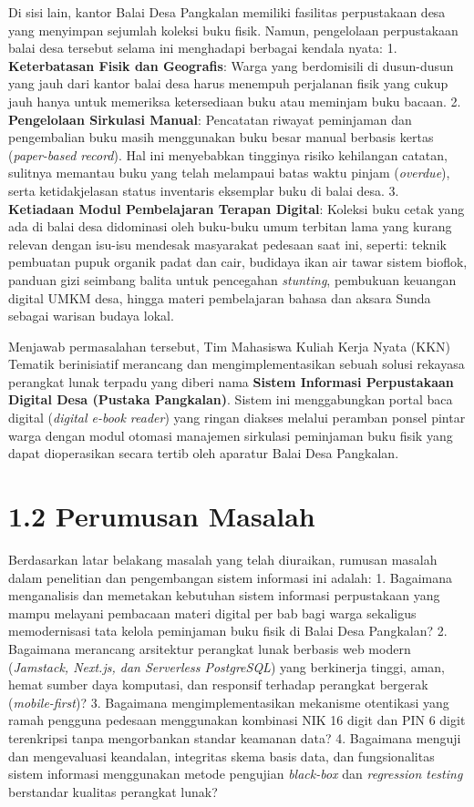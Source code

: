 \documentclass[
  indonesian,
  12pt,
]{report}
\begin{document}
Di sisi lain, kantor Balai Desa Pangkalan memiliki fasilitas
perpustakaan desa yang menyimpan sejumlah koleksi buku fisik. Namun,
pengelolaan perpustakaan balai desa tersebut selama ini menghadapi
berbagai kendala nyata: 1. \textbf{Keterbatasan Fisik dan Geografis}:
Warga yang berdomisili di dusun-dusun yang jauh dari kantor balai desa
harus menempuh perjalanan fisik yang cukup jauh hanya untuk memeriksa
ketersediaan buku atau meminjam buku bacaan. 2. \textbf{Pengelolaan
Sirkulasi Manual}: Pencatatan riwayat peminjaman dan pengembalian buku
masih menggunakan buku besar manual berbasis kertas (\emph{paper-based
record}). Hal ini menyebabkan tingginya risiko kehilangan catatan,
sulitnya memantau buku yang telah melampaui batas waktu pinjam
(\emph{overdue}), serta ketidakjelasan status inventaris eksemplar buku
di balai desa. 3. \textbf{Ketiadaan Modul Pembelajaran Terapan Digital}:
Koleksi buku cetak yang ada di balai desa didominasi oleh buku-buku umum
terbitan lama yang kurang relevan dengan isu-isu mendesak masyarakat
pedesaan saat ini, seperti: teknik pembuatan pupuk organik padat dan
cair, budidaya ikan air tawar sistem bioflok, panduan gizi seimbang
balita untuk pencegahan \emph{stunting}, pembukuan keuangan digital UMKM
desa, hingga materi pembelajaran bahasa dan aksara Sunda sebagai warisan
budaya lokal.

Menjawab permasalahan tersebut, Tim Mahasiswa Kuliah Kerja Nyata (KKN)
Tematik berinisiatif merancang dan mengimplementasikan sebuah solusi
rekayasa perangkat lunak terpadu yang diberi nama \textbf{Sistem
Informasi Perpustakaan Digital Desa (Pustaka Pangkalan)}. Sistem ini
menggabungkan portal baca digital (\emph{digital e-book reader}) yang
ringan diakses melalui peramban ponsel pintar warga dengan modul otomasi
manajemen sirkulasi peminjaman buku fisik yang dapat dioperasikan secara
tertib oleh aparatur Balai Desa Pangkalan.

\section{1.2 Perumusan Masalah}\label{perumusan-masalah}

Berdasarkan latar belakang masalah yang telah diuraikan, rumusan masalah
dalam penelitian dan pengembangan sistem informasi ini adalah: 1.
Bagaimana menganalisis dan memetakan kebutuhan sistem informasi
perpustakaan yang mampu melayani pembacaan materi digital per bab bagi
warga sekaligus memodernisasi tata kelola peminjaman buku fisik di Balai
Desa Pangkalan? 2. Bagaimana merancang arsitektur perangkat lunak
berbasis web modern (\emph{Jamstack, Next.js, dan Serverless
PostgreSQL}) yang berkinerja tinggi, aman, hemat sumber daya komputasi,
dan responsif terhadap perangkat bergerak (\emph{mobile-first})? 3.
Bagaimana mengimplementasikan mekanisme otentikasi yang ramah pengguna
pedesaan menggunakan kombinasi NIK 16 digit dan PIN 6 digit terenkripsi
tanpa mengorbankan standar keamanan data? 4. Bagaimana menguji dan
mengevaluasi keandalan, integritas skema basis data, dan fungsionalitas
sistem informasi menggunakan metode pengujian \emph{black-box} dan
\emph{regression testing} berstandar kualitas perangkat lunak?
\end{document}

